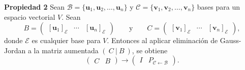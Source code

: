 {\begin{frame}
	\vspace{-1mm}
	\begin{prop}{\textbf{Propiedad 2}}
		\justifying
		Sean $\mathcal{B}=\{\mathbf{u}_1, \mathbf{u}_2, \hdots , \mathbf{u}_n \}$ y $\mathcal{C}=\{\mathbf{v}_1, \mathbf{v}_2, \hdots , \mathbf{v}_n \}$  bases para un espacio  vectorial $V$. Sean
		\[
		B = \left( 
		\begin{array}{c|c|c} \left[ \mathbf{u}_1 \right]_{\mathcal{E}}  & \cdots & \left[ \mathbf{u}_n \right]_{\mathcal{E}}
		\end{array} 
		\right)
		\qquad \text{y} \qquad 
		C = \left( 
		\begin{array}{c|c|c} \left[ \mathbf{v}_1 \right]_{\mathcal{E}}  & \cdots & \left[ \mathbf{v}_n \right]_{\mathcal{E}}
		\end{array} 
		\right),
		\]
		donde $\mathcal{E}$ es cualquier base para $V$. Entonces al aplicar eliminación de Gauss-Jordan a la matriz aumentada $(\ C\ |\ B\ )$, se obtiene
		\[	
		\left( 
		\begin{array}{c|c} C & B
		\end{array} 
		\right)
		\longrightarrow
		\left( 
		\begin{array}{c|c} I & P_{\mathcal{C} \leftarrow\mathcal{B}}
		\end{array} 
		\right).
		\]
	\end{prop}	
	
\end{frame}
}


\subsection{}

